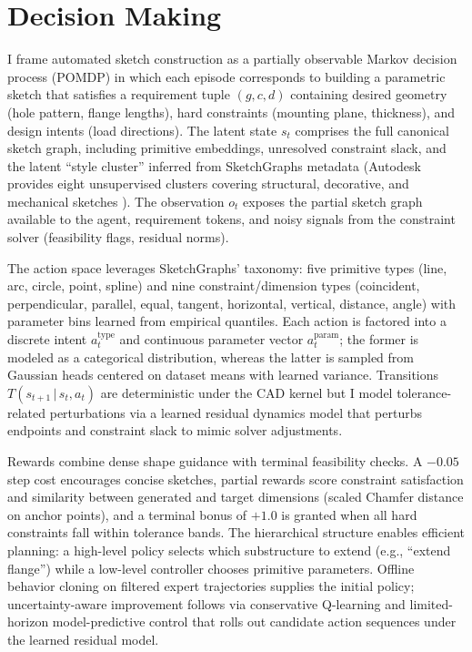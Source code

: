 \documentclass[twoside,11pt]{article}
\begin{document}
\section{Decision Making}
I frame automated sketch construction as a partially observable Markov decision process (POMDP) in which each episode corresponds to building a parametric sketch that satisfies a requirement tuple $(g, c, d)$ containing desired geometry (hole pattern, flange lengths), hard constraints (mounting plane, thickness), and design intents (load directions). The latent state $s_t$ comprises the full canonical sketch graph, including primitive embeddings, unresolved constraint slack, and the latent ``style cluster'' inferred from SketchGraphs metadata (Autodesk provides eight unsupervised clusters covering structural, decorative, and mechanical sketches \citep{SketchGraphs2020}). The observation $o_t$ exposes the partial sketch graph available to the agent, requirement tokens, and noisy signals from the constraint solver (feasibility flags, residual norms).

The action space leverages SketchGraphs' taxonomy: five primitive types (line, arc, circle, point, spline) and nine constraint/dimension types (coincident, perpendicular, parallel, equal, tangent, horizontal, vertical, distance, angle) with parameter bins learned from empirical quantiles. Each action is factored into a discrete intent $a^{\text{type}}_t$ and continuous parameter vector $a^{\text{param}}_t$; the former is modeled as a categorical distribution, whereas the latter is sampled from Gaussian heads centered on dataset means with learned variance. Transitions $T(s_{t+1}\,|\,s_t, a_t)$ are deterministic under the CAD kernel but I model tolerance-related perturbations via a learned residual dynamics model that perturbs endpoints and constraint slack to mimic solver adjustments.

Rewards combine dense shape guidance with terminal feasibility checks. A $-0.05$ step cost encourages concise sketches, partial rewards score constraint satisfaction and similarity between generated and target dimensions (scaled Chamfer distance on anchor points), and a terminal bonus of $+1.0$ is granted when all hard constraints fall within tolerance bands. The hierarchical structure enables efficient planning: a high-level policy selects which substructure to extend (e.g., ``extend flange'') while a low-level controller chooses primitive parameters. Offline behavior cloning on filtered expert trajectories supplies the initial policy; uncertainty-aware improvement follows via conservative Q-learning and limited-horizon model-predictive control that rolls out candidate action sequences under the learned residual model.
\end{document}
